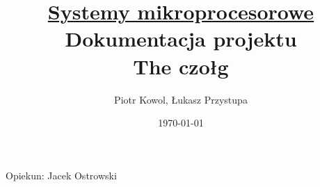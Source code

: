 \documentclass[12pt]{article}
\title{\underline{Systemy mikroprocesorowe}\\\textbf{Dokumentacja projektu}\\The czołg}
\author{Piotr Kowol, Łukasz Przystupa}
\date{\today}
\begin{document}
    \maketitle
    \begin{center}
        Opiekun: Jacek Ostrowski
    \end{center}
    \thispagestyle{empty}
    \newpage


    
    \thispagestyle{empty}
    \newpage
    
    \tableofcontents
    \newpage
    
    
\end{document}
